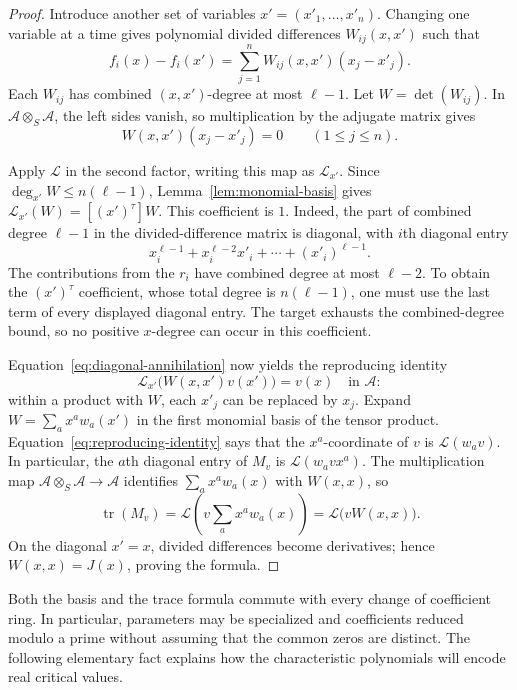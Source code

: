 \begin{proof}
Introduce another set of variables $x'=(x'_1,\ldots,x'_n)$.
Changing one variable at a time gives polynomial divided differences
$W_{ij}(x,x')$ such that
\[
 f_i(x)-f_i(x')=\sum_{j=1}^n
 W_{ij}(x,x')(x_j-x'_j).
\]
Each $W_{ij}$ has combined $(x,x')$-degree at most $\ell-1$.
Let $W=\det(W_{ij})$.  In $\mathcal A\otimes_S\mathcal A$, the
left sides vanish, so multiplication by the adjugate matrix gives
\begin{equation}\label{eq:diagonal-annihilation}
 W(x,x')(x_j-x'_j)=0\qquad(1\le j\le n).
\end{equation}

Apply $\mathcal L$ in the second factor, writing this map as
$\mathcal L_{x'}$.  Since $\deg_{x'}W\le n(\ell-1)$,
Lemma~\ref{lem:monomial-basis} gives
$\mathcal L_{x'}(W)=[(x')^\tau]W$.  This coefficient is $1$.
Indeed, the part of combined degree $\ell-1$ in the divided-difference
matrix is diagonal, with $i$th diagonal entry
\[
 x_i^{\ell-1}+x_i^{\ell-2}x'_i+\cdots+(x'_i)^{\ell-1}.
\]
The contributions from the $r_i$ have combined degree at most
$\ell-2$.  To obtain the $(x')^\tau$ coefficient, whose total
degree is $n(\ell-1)$, one must use the last term of every displayed
diagonal entry.  The target exhausts the combined-degree bound, so
no positive $x$-degree can occur in this coefficient.

Equation~\eqref{eq:diagonal-annihilation} now yields the reproducing
identity
\begin{equation}\label{eq:reproducing-identity}
 \mathcal L_{x'}\bigl(W(x,x')v(x')\bigr)=v(x)
 \quad\text{in }\mathcal A:
\end{equation}
within a product with $W$, each $x'_j$ can be replaced by $x_j$.
Expand $W=\sum_a x^a w_a(x')$ in the first monomial basis of the
tensor product.  Equation~\eqref{eq:reproducing-identity} says that
the $x^a$-coordinate of $v$ is $\mathcal L(w_a v)$.  In particular,
the $a$th diagonal entry of $M_v$ is $\mathcal L(w_a v x^a)$.
The multiplication map $\mathcal A\otimes_S\mathcal A\to\mathcal A$
identifies $\sum_a x^a w_a(x)$ with $W(x,x)$, so
\[
 \operatorname{tr}(M_v)
 =\mathcal L\!\left(v\sum_a x^a w_a(x)\right)
 =\mathcal L\bigl(vW(x,x)\bigr).
\]
On the diagonal $x'=x$, divided differences become derivatives;
hence $W(x,x)=J(x)$, proving the formula.
\end{proof}

Both the basis and the trace formula commute with every change of
coefficient ring.  In particular, parameters may be specialized and
coefficients reduced modulo a prime without assuming that the common
zeros are distinct.  The following elementary fact explains how the
characteristic polynomials will encode real critical values.

